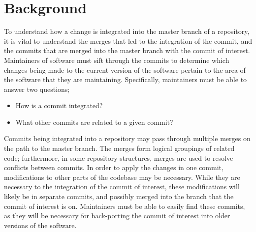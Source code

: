 \chapter{Background}\label{chap:background}

To understand how a change is integrated into the master branch of a
repository, it is vital to understand the merges that led to the
integration of the commit, and the commits that are merged into the
master branch with the commit of interest. Maintainers of software must
sift through the commits to determine which changes being made to the
current version of the software pertain to the area of the software that
they are maintaining. Specifically, maintainers must be able to answer
two questions;

\begin{textbox}
\begin{itemize}
  \item How is a commit integrated?
  \item What other commits are related to a given commit?
\end{itemize}
\end{textbox}

Commits being integrated into a repository may pass through multiple
merges on the path to the master branch. The merges form logical
groupings of related code; furthermore, in some repository structures,
merges are used to resolve conflicts between commits. In order to apply
the changes in one commit, modifications to other parts of the codebase
may be necessary. While they are necessary to the integration of the
commit of interest, these modifications will likely be in separate
commits, and possibly merged into the branch that the commit of interest
is on. Maintainers must be able to easily find these commits, as they
will be necessary for back-porting the commit of interest into older
versions of the software.

